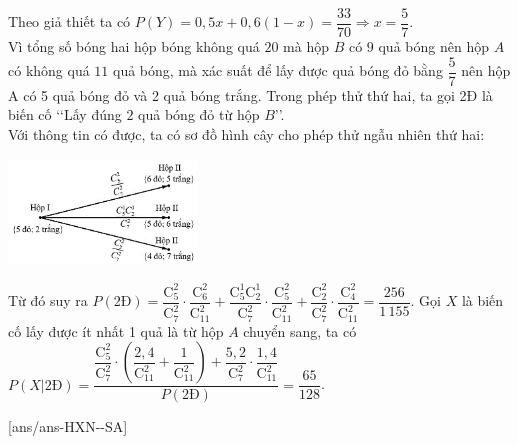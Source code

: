 \begin{ex}
{\begin{itemchoice}
{            }
            Theo giả thiết ta có $P(Y)=0{,}5x+0{,}6(1-x)=\dfrac{33}{70}\Rightarrow x=\dfrac{5}{7}$.\\
            Vì tổng số bóng hai hộp bóng không quá $20$ mà hộp $B$ có $9$ quả bóng nên hộp $A$ có không quá $11$ quả bóng, mà xác suất để lấy được quả bóng đỏ bằng $\dfrac{5}{7}$ nên hộp A có 5 quả bóng đỏ và 2 quả bóng trắng.
            \itemch Trong phép thử thứ hai, ta gọi 2Đ là biến cố \lq\lq Lấy đúng $2$ quả bóng đỏ từ hộp $B$\rq\rq.\\
            Với thông tin có được, ta có sơ đồ hình cây cho phép thử ngẫu nhiên thứ hai:\\
            \centerline{\includegraphics[width=5cm]{img/HXN-2-16-LG-b}}
            Từ đó suy ra $P(2\text{Đ})=\dfrac{\mathrm{C}_5^2}{\mathrm{C}_7^2}\cdot \dfrac{\mathrm{C}_6^2}{\mathrm{C}_{11}^2}+\dfrac{\mathrm{C}_5^1\mathrm{C}_2^1}{\mathrm{C}_7^2}\cdot \dfrac{\mathrm{C}_5^2}{\mathrm{C}_{11}^2}+\dfrac{\mathrm{C}_2^2}{\mathrm{C}_7^2}\cdot \dfrac{\mathrm{C}_4^2}{\mathrm{C}_{11}^2}=\dfrac{256}{1\,155}$.
            \itemch Gọi $X$ là biến cố lấy được ít nhất 1 quả là từ hộp $A$ chuyển sang, ta có\\
            $P\left(X|2\text{Đ}\right)=\dfrac{\dfrac{\mathrm{C}_5^2}{\mathrm{C}_7^2}\cdot \left(\dfrac{2{,}4}{\mathrm{C}_{11}^2}+\dfrac{1}{\mathrm{C}_{11}^2}\right)+\dfrac{5{,}2}{\mathrm{C}_7^2}\cdot \dfrac{1{,}4}{\mathrm{C}_{11}^2}}{P(2\text{Đ})}=\dfrac{65}{128}$.
        \end{itemchoice}
    }
\end{ex}
\caukq
{}[ans/ans-HXN-\sode-SA]

